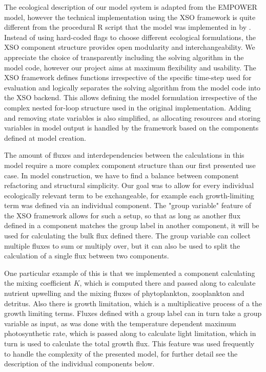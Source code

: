 \documentclass[journal abbreviation, manuscript]{copernicus}
\begin{document}
The ecological description of our model system is adapted from the EMPOWER model, however the technical implementation using the XSO framework is quite different from the procedural R script that the model was implemented in by \citet{Anderson2015c}. Instead of using hard-coded flags to choose different ecological formulations, the XSO component structure provides open modularity and interchangeability. We appreciate the choice of transparently including the solving algorithm in the model code, however our project aims at maximum flexibility and usability. The XSO framework defines functions irrespective of the specific time-step used for evaluation and logically separates the solving algorithm from the model code into the XSO backend. This allows defining the model formulation irrespective of the complex nested for-loop structure used in the original implementation. Adding and removing state variables is also simplified, as allocating resources and storing variables in model output is handled by the framework based on the components defined at model creation.

The amount of fluxes and interdependencies between the calculations in this model require a more complex component structure than our first presented use case. In model construction, we have to find a balance between component refactoring and structural simplicity. Our goal was to allow for every individual ecologically relevant term to be exchangeable, for example each growth-limiting term was defined via an individual component. The "group variable" feature of the XSO framework allows for such a setup, so that as long as another flux defined in a component matches the group label in another component, it will be used for calculating the bulk flux defined there. The group variable can collect multiple fluxes to sum or multiply over, but it can also be used to split the calculation of a single flux between two components.

One particular example of this is that we implemented a component calculating the mixing coefficient $K$, which is computed there and passed along to calculate nutrient upwelling and the mixing fluxes of phytoplankton, zooplankton and detritus. Also there is growth limitation, which is a multiplicative process of a the growth limiting terms. Fluxes defined with a group label can in turn take a group variable as input, as was done with the temperature dependent maximum photosynthetic rate, which is passed along to calculate light limitation, which in turn is used to calculate the total growth flux. This feature was used frequently to handle the complexity of the presented model, for further detail see the description of the individual components below.
\end{document}
